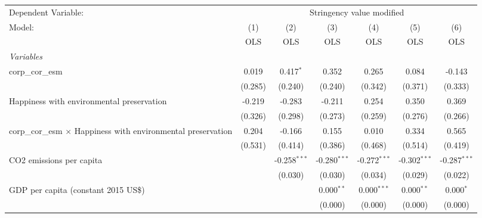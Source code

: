 
\begingroup
\centering
\begin{tabular}{lcccccc}
   \toprule
   Dependent Variable: & \multicolumn{6}{c}{Stringency value modified}\\
   Model:                                                               & (1)     & (2)            & (3)            & (4)            & (5)            & (6)\\  
                                                                        &  OLS    & OLS            & OLS            & OLS            & OLS            & OLS\\  
   \midrule
   \emph{Variables}\\
   corp\_cor\_esm                                                       & 0.019   & 0.417$^{*}$    & 0.352          & 0.265          & 0.084          & -0.143\\   
                                                                        & (0.285) & (0.240)        & (0.240)        & (0.342)        & (0.371)        & (0.333)\\   
   Happiness with environmental preservation                            & -0.219  & -0.283         & -0.211         & 0.254          & 0.350          & 0.369\\   
                                                                        & (0.326) & (0.298)        & (0.273)        & (0.259)        & (0.276)        & (0.266)\\   
   corp\_cor\_esm $\times$ Happiness with environmental preservation    & 0.204   & -0.166         & 0.155          & 0.010          & 0.334          & 0.565\\   
                                                                        & (0.531) & (0.414)        & (0.386)        & (0.468)        & (0.514)        & (0.419)\\   
   CO2 emissions per capita                                             &         & -0.258$^{***}$ & -0.280$^{***}$ & -0.272$^{***}$ & -0.302$^{***}$ & -0.287$^{***}$\\   
                                                                        &         & (0.030)        & (0.030)        & (0.034)        & (0.029)        & (0.022)\\   
   GDP per capita (constant 2015 US\$)                                  &         &                & 0.000$^{**}$   & 0.000$^{***}$  & 0.000$^{**}$   & 0.000$^{*}$\\   
                                                                        &         &                & (0.000)        & (0.000)        & (0.000)        & (0.000)\\   

\end{tabular}

